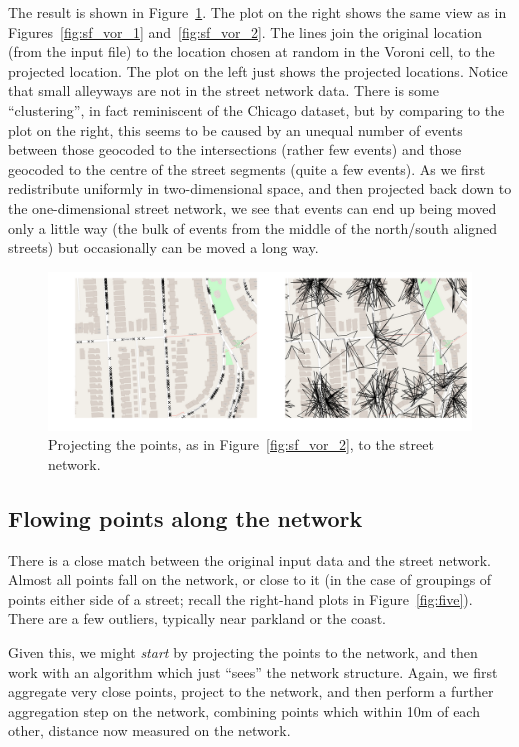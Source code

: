 \documentclass[twoside,a4paper,twocolumn,10pt]{article}
\theoremstyle{plain}
\theoremstyle{definition}
\begin{document}
The result is shown in Figure~\ref{fig:sf_net_1}.  The plot on the right shows the same view
as in Figures~\ref{fig:sf_vor_1} and~\ref{fig:sf_vor_2}.  The lines join the original location
(from the input file) to the location chosen at random in the Voroni cell, to the projected
location.  The plot on the left just shows the projected locations.  Notice that small alleyways
are not in the street network data.  There is some ``clustering'', in fact reminiscent of
the Chicago dataset, but by comparing to the plot on the right, this seems to be caused
by an unequal number of events between those geocoded to the intersections (rather few events)
and those geocoded to the centre of the street segments (quite a few events).  As we first
redistribute uniformly in two-dimensional space, and then projected back down to the
one-dimensional street network, we see that events can end up being moved only a little way
(the bulk of events from the middle of the north/south aligned streets) but occasionally can
be moved a long way.

\begin{figure}
  \includegraphics[width=\textwidth]{san_fran_two_stage_network_projection.png}
  \caption{Projecting the points, as in Figure~\ref{fig:sf_vor_2}, to the street network.}
  \label{fig:sf_net_1}
\end{figure}



\subsection{Flowing points along the network}\label{sec:sf_flow}

There is a close match between the original input data and the street network.  Almost all
points fall on the network, or close to it (in the case of groupings of points either side
of a street; recall the right-hand plots in Figure~\ref{fig:five}).  There are a few outliers,
typically near parkland or the coast.

Given this, we might \emph{start} by projecting the points to the network, and then work with
an algorithm which just ``sees'' the network structure.  Again, we first aggregate very close
points, project to the network, and then perform a further aggregation step on the network,
combining points which within 10m of each other, distance now measured on the network.
\end{document}
